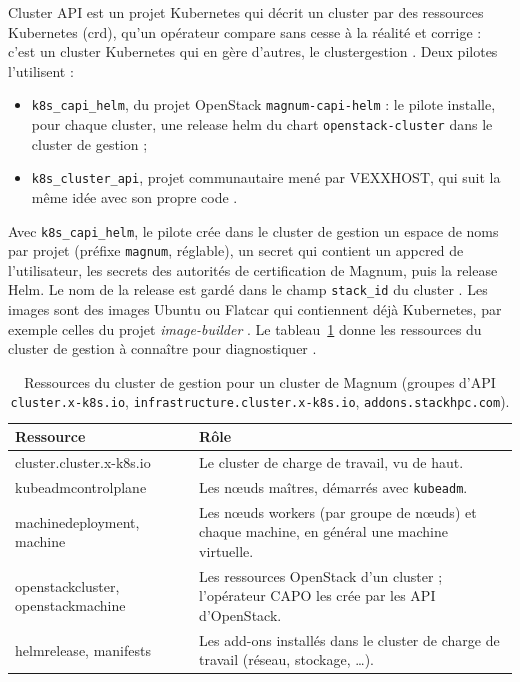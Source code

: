 Cluster API est un projet Kubernetes qui décrit un cluster par des ressources Kubernetes (\gls{crd}), qu'un opérateur compare
sans cesse à la réalité et corrige : c'est un cluster Kubernetes qui en gère d'autres, le \gls{clustergestion}
\parencite{magnum-capi-helm-user,capi-book}. Deux pilotes l'utilisent \parencite{magnum-relnotes-2025-1} :

\begin{itemize}
  \item \texttt{k8s\_capi\_helm}, du projet OpenStack \texttt{magnum-capi-helm} : le pilote installe, pour chaque cluster, une
        release \gls{helm} du chart \texttt{openstack-cluster} dans le cluster de gestion ;
  \item \texttt{k8s\_cluster\_api}, projet communautaire mené par VEXXHOST, qui suit la même idée avec son propre code
        \parencite{magnum-cluster-api}.
\end{itemize}

Avec \texttt{k8s\_capi\_helm}, le pilote crée dans le cluster de gestion un espace de noms par projet (préfixe \texttt{magnum},
réglable), un secret qui contient un \gls{appcred} de l'utilisateur, les secrets des autorités de certification de Magnum, puis
la release Helm. Le nom de la release est gardé dans le champ \texttt{stack\_id} du cluster
\parencite{magnum-capi-helm-source,magnum-capi-helm-user}. Les images sont des images Ubuntu ou Flatcar qui contiennent déjà
Kubernetes, par exemple celles du projet \emph{image-builder} \parencite{magnum-capi-helm-install}. Le tableau~\ref{tab:ma-crd}
donne les ressources du cluster de gestion à connaître pour diagnostiquer \parencite{magnum-capi-helm-user}.

\begin{table}[!ht]
\centering
\renewcommand{\arraystretch}{1.3}
\begin{tabular}{@{}>{\raggedright\arraybackslash\ttfamily\small}p{5.0cm}>{\raggedright\arraybackslash}p{10.5cm}@{}}
\toprule
\textrm{\textbf{Ressource}} & \textbf{Rôle} \\
\midrule
cluster.cluster.x-k8s.io & Le cluster de charge de travail, vu de haut. \\
kubeadmcontrolplane & Les nœuds maîtres, démarrés avec \texttt{kubeadm}. \\
machinedeployment, machine & Les nœuds workers (par groupe de nœuds) et chaque machine, en général une machine virtuelle. \\
openstackcluster, openstackmachine & Les ressources OpenStack d'un cluster ; l'opérateur CAPO les crée par les API d'OpenStack. \\
helmrelease, manifests & Les add-ons installés dans le cluster de charge de travail (réseau, stockage, \dots). \\
\bottomrule
\end{tabular}
\caption{Ressources du cluster de gestion pour un cluster de Magnum (groupes d'API \texttt{cluster.x-k8s.io},
\texttt{infrastructure.cluster.x-k8s.io}, \texttt{addons.stackhpc.com}).}
\label{tab:ma-crd}
\end{table}

